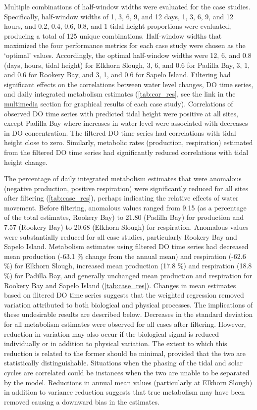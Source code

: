 \documentclass[letterpaper,12pt,oneside]{article}\usepackage[]{graphicx}\usepackage[]{color}
\begin{document}
Multiple combinations of half-window widths were evaluated for the case studies.  Specifically, half-window widths of 1, 3, 6, 9, and 12 days, 1, 3, 6, 9, and 12 hours, and 0.2, 0.4, 0.6, 0.8, and 1 tidal height proportions were evaluated, producing a total of 125 unique combinations.  Half-window widths that maximized the four performance metrics for each case study were chosen as the `optimal' values.  Accordingly, the optimal half-window widths were 12, 6, and 0.8 (days, hours, tidal height) for Elkhorn Slough, 3, 6, and 0.6 for Padilla Bay, 3, 1, and 0.6 for Rookery Bay, and 3, 1, and 0.6 for Sapelo Island.  Filtering had significant effects on the correlations between water level changes, \ac{DO} time series, and daily integrated metabolism estimates (\cref{tab:cor_res}, see the link in the \hyperref[multi]{multimedia} section for graphical results of each case study).  Correlations of observed \ac{DO} time series with predicted tidal height were positive at all sites, except Padilla Bay where increases in water level were associated with decreases in \ac{DO}  concentration.  The filtered \ac{DO} time series had correlations with tidal height close to zero. Similarly, metabolic rates (production, respiration) estimated from the filtered \ac{DO} time series had significantly reduced correlations with tidal height change. 

The percentage of daily integrated metabolism estimates that were anomalous (negative production, positive respiration) were significantly reduced for all sites after filtering (\cref{tab:case_res}), perhaps indicating the relative effects of water movement.  Before filtering, anomalous values ranged from 9.15 (as a percentage of the total estimates, Rookery Bay) to 21.80 (Padilla Bay) for production and 7.57 (Rookery Bay) to 20.68 (Elkhorn Slough) for respiration. Anomalous values were substantially reduced for all case studies, particularly Rookery Bay and Sapelo Island.  Metabolism estimates using filtered \ac{DO} time series had decreased mean production (-63.1 \% change from the annual mean) and respiration (-62.6 \%) for Elkhorn Slough, increased mean production (17.8 \%) and respiration (18.8 \%) for Padilla Bay, and generally unchanged mean production and respiration for Rookery Bay and Sapelo Island (\cref{tab:case_res}).  Changes in mean estimates based on filtered \ac{DO} time series suggests that the weighted regression removed variation attributed to both biological and physical processes.  The implications of these undesirable results are described below.  Decreases in the standard deviation for all metabolism estimates were observed for all cases after filtering.  However, reduction in variation may also occur if the biological signal is reduced individually or in addition to physical variation.  The extent to which this reduction is related to the former should be minimal, provided that the two are statistically distinguishable.  Situations when the phasing of the tidal and solar cycles are correlated could be instances when the two are unable to be separated by the model.  Reductions in annual mean values (particularly at Elkhorn Slough) in addition to variance reduction suggests that true metabolism may have been removed causing a downward bias in the estimates.
\end{document}
